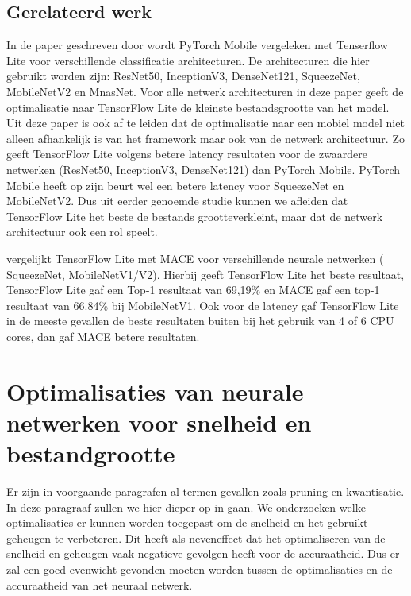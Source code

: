 \subsection{Gerelateerd werk}
In de paper geschreven door \cite{luo_comparison_2020} wordt PyTorch Mobile vergeleken met Tenserflow Lite voor verschillende classificatie architecturen.
De architecturen die hier gebruikt worden zijn: ResNet50, InceptionV3, DenseNet121, SqueezeNet, MobileNetV2 en MnasNet.
Voor alle netwerk architecturen in deze paper geeft de optimalisatie naar TensorFlow Lite de kleinste bestandsgrootte van het model. 
Uit deze paper is ook af te leiden dat de optimalisatie naar een mobiel model niet alleen afhankelijk is van het framework maar ook van de netwerk architectuur.
Zo geeft TensorFlow Lite volgens \cite{luo_comparison_2020} betere latency resultaten voor de zwaardere netwerken (ResNet50, InceptionV3, DenseNet121) dan PyTorch Mobile.
PyTorch Mobile heeft op zijn beurt wel een betere latency voor SqueezeNet en MobileNetV2.
Dus uit eerder genoemde studie kunnen we afleiden dat TensorFlow Lite het beste de bestands grootteverkleint, maar dat de netwerk architectuur ook een rol speelt.

\cite{febvay_low-level_2020} vergelijkt TensorFlow Lite met MACE voor verschillende neurale netwerken ( SqueezeNet, MobileNetV1/V2).
Hierbij geeft TensorFlow Lite het beste resultaat, TensorFlow Lite gaf een Top-1 resultaat van 69,19\% en MACE gaf een top-1 resultaat van 66.84\% bij MobileNetV1.
Ook voor de latency gaf TensorFlow Lite in de meeste gevallen de beste resultaten buiten bij het gebruik van 4 of 6 CPU cores, dan gaf MACE betere resultaten.  

\section{Optimalisaties van neurale netwerken voor snelheid en bestandgrootte} \label{optim}
Er zijn in voorgaande paragrafen al termen gevallen zoals pruning en kwantisatie.
In deze paragraaf zullen we hier dieper op in gaan.
We onderzoeken welke optimalisaties er kunnen worden toegepast om de snelheid en het gebruikt geheugen te verbeteren.
Dit heeft als neveneffect dat het optimaliseren van de snelheid en geheugen vaak negatieve gevolgen heeft voor de accuraatheid.
Dus er zal een goed evenwicht gevonden moeten worden tussen de optimalisaties en de accuraatheid van het neuraal netwerk.

